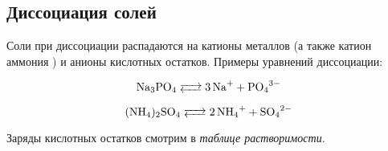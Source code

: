 \subsection{Диссоциация солей}

Соли при диссоциации распадаются на катионы металлов (а также катион аммония ) и анионы кислотных остатков. Примеры уравнений диссоциации:

\begin{equation*}
\ce{Na3PO4 <--> 3Na^+ + PO4^{3-}}
\end{equation*}

\begin{equation*}
\ce{(NH4)_2SO4 <--> 2NH4^+ + SO4^{2-}}
\end{equation*}

Заряды кислотных остатков смотрим в \textit{таблице растворимости}.
